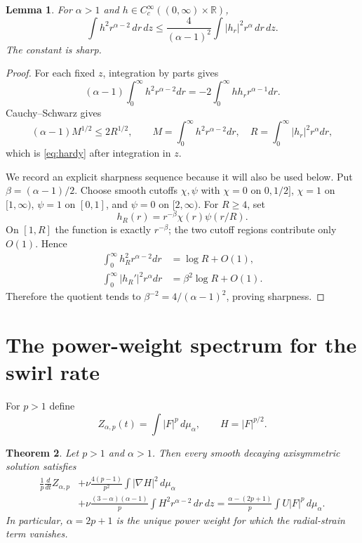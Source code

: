 \documentclass[11pt]{article}
\numberwithin{equation}{section}
\newtheorem{theorem}{Theorem}[section]
\newtheorem{lemma}[theorem]{Lemma}
\theoremstyle{remark}
\newcommand{\R}{\mathbb R}
\begin{document}
\begin{lemma}\label{lem:hardy}
For \(\alpha>1\) and \(h\in C_c^\infty((0,\infty)\times\R)\),
\begin{equation}\label{eq:hardy}
 \int h^2r^{\alpha-2}\,dr\,dz
 \le \frac4{(\alpha-1)^2}
 \int |h_r|^2r^\alpha\,dr\,dz.
\end{equation}
The constant is sharp.
\end{lemma}

\begin{proof}
For each fixed \(z\), integration by parts gives
\[
 (\alpha-1)\int_0^\infty h^2r^{\alpha-2}dr
 =-2\int_0^\infty hh_rr^{\alpha-1}dr.
\]
Cauchy--Schwarz gives
\[
 (\alpha-1)M^{1/2}\le 2R^{1/2},
 \qquad
 M=\int_0^\infty h^2r^{\alpha-2}dr,\quad
 R=\int_0^\infty |h_r|^2r^\alpha dr,
\]
which is \eqref{eq:hardy} after integration in \(z\).

We record an explicit sharpness sequence because it will also be used below.  Put
\(\beta=(\alpha-1)/2\).  Choose smooth cutoffs \(\chi,\psi\) with
\(\chi=0\) on \(0,1/2]\), \(\chi=1\) on \([1,\infty)\),
\(\psi=1\) on \([0,1]\), and \(\psi=0\) on \([2,\infty)\).  For \(R\ge4\), set
\[
 h_R(r)=r^{-\beta}\chi(r)\psi(r/R).
\]
On \([1,R]\) the function is exactly \(r^{-\beta}\); the two cutoff regions contribute only \(O(1)\).  Hence
\begin{align*}
 \int_0^\infty h_R^2r^{\alpha-2}dr&=\log R+O(1),\\
 \int_0^\infty |h_R'|^2r^\alpha dr&=\beta^2\log R+O(1).
\end{align*}
Therefore the quotient tends to \(\beta^{-2}=4/(\alpha-1)^2\), proving sharpness.
\end{proof}

\section{The power-weight spectrum for the swirl rate}

For \(p>1\) define
\[
 Z_{\alpha,p}(t)=\int |F|^p\,d\mu_\alpha,
 \qquad H=|F|^{p/2}.
\]

\begin{theorem}\label{thm:Fidentity}
Let \(p>1\) and \(\alpha>1\).  Then every smooth decaying axisymmetric solution satisfies
\begin{align}
 \frac1p\frac{d}{dt}Z_{\alpha,p}
 &+\nu\frac{4(p-1)}{p^2}\int|\nabla H|^2\,d\mu_\alpha\nonumber\\
 &+\nu\frac{(3-\alpha)(\alpha-1)}p
 \int H^2r^{\alpha-2}\,dr\,dz
 =\frac{\alpha-(2p+1)}p\int U|F|^p\,d\mu_\alpha.
 \label{eq:Fweighted}
\end{align}
In particular, \(\alpha=2p+1\) is the unique power weight for which the radial-strain term vanishes.
\end{theorem}
\end{document}
